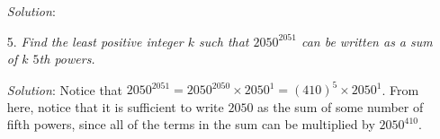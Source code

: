 \documentclass{article}
\begin{document}
\begin{enumerate}[1.]
\textit{Solution}:
\vspace{6.81mm}

\item[5.] %
\textit{Find the least positive integer $k$ such that $2050^{2051}$ can be written as a sum of $k$ $5$th powers.}

\textit{Solution}: 
Notice that $2050^{2051} = 2050^{2050} \times 2050^{1} = (410)^{5} \times 2050^{1}$. From here, notice that it is sufficient to write $2050$ as the sum of some number of fifth powers, since all of the terms in the sum can be multiplied by $2050^{410}$.



\end{enumerate}
\end{document}
